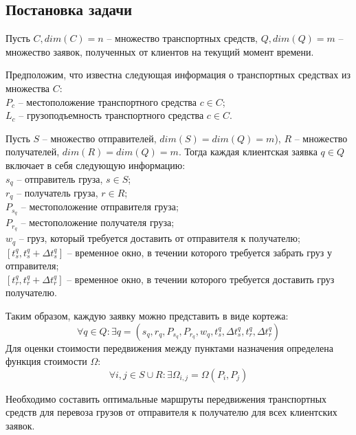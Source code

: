 \documentclass[]{TAACpaper}
\begin{document}
\subsection{Постановка задачи}
Пусть $C,dim(C)=n$ – множество транспортных средств, $Q,dim(Q)=m$ – множество заявок, полученных от клиентов на текущий момент времени.

Предположим, что известна следующая информация о транспортных средствах из множества $C$: \\
$P_c$ -- местоположение транспортного средства $c \in C$;\\
$L_c$ -- грузоподъемность транспортного средства $c \in C$.

Пусть $S$ -- множество отправителей, $dim(S) = dim(Q) = m$), $R$ -- множество получателей, $dim(R) = dim(Q) = m$. Тогда каждая клиентская заявка $q \in Q$ включает в себя следующую информацию:\\
$s_q$ -- отправитель груза, $s \in S$; \\
$r_q$ -- получатель груза, $r \in R$; \\
$P_{s_q}$ -- местоположение отправителя груза;\\
$P_{r_q}$ -- местоположение получателя груза; \\
$w_q$ -- груз, который требуется доставить от отправителя к получателю; \\
$[t_{s}^{q}, t_{s}^{q}+ \Delta{t_{s}^{q}}]$ -- временное окно, в течении которого требуется забрать груз у отправителя;\\ 
$[t_{r}^{q}, t_{r}^{q}+ \Delta{t_{r}^{q}}]$ -- временное окно, в течении которого требуется доставить груз получателю.
 
Таким образом, каждую заявку можно представить в виде кортежа:
\begin{equation}
\forall q \in Q: \exists q = (s_q,r_q, P_{s_q}, P_{r_q}, w_q, t_{s}^{q}, \Delta{t_{s}^{q}}, t_{r}^{q}, \Delta{t_{r}^{q}})
\end{equation}
Для оценки стоимости передвижения между пунктами назначения определена функция стоимости $\Omega$: 
\begin{equation}
\forall i,j \in S \cup R: \exists \Omega_{i,j} = \Omega(P_i,P_j)
\end{equation}

Необходимо составить оптимальные маршруты передвижения транспортных средств для перевоза грузов от отправителя к получателю для всех клиентских заявок.
\end{document}
